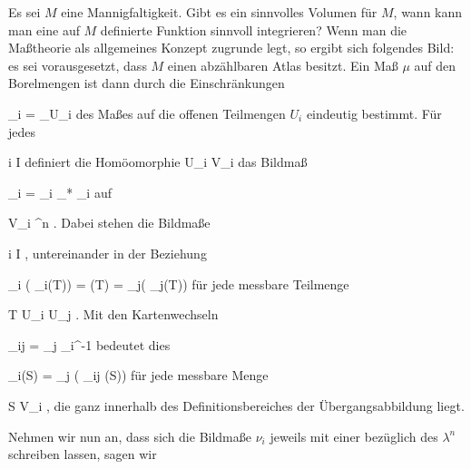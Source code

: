 
Es sei $M$ eine Mannigfaltigkeit. Gibt es ein sinnvolles Volumen für
 {} {}
$M$, wann kann man eine auf $M$ definierte Funktion sinnvoll integrieren? Wenn man die Maßtheorie als allgemeines Konzept zugrunde legt, so ergibt sich folgendes Bild: es sei vorausgesetzt, dass $M$ einen abzählbaren Atlas
 besitzt. Ein Maß $\mu$ auf den Borelmengen
 ist dann durch die Einschränkungen

\mavergleichskette
{\vergleichskette
{ \mu_i
}
{ = }{ \mu \vert_{U_i }
}
{  }{
}
{    }{
}
{   }{
}
}
{}{}{}
des Maßes auf die offenen Teilmengen $U_i$ eindeutig bestimmt. Für jedes

\mavergleichskette
{\vergleichskette
{ i
}
{ \in }{ I
}
{  }{
}
{    }{
}
{   }{
}
}
{}{}{}
definiert die Homöomorphie
 {U_i } { V_i
} {}
das Bildmaß

\mavergleichskette
{\vergleichskette
{ \nu_i
}
{ = }{ {\alpha_i }_* \mu_i
}
{  }{
}
{    }{
}
{   }{
}
}
{}{}{}
auf

\mavergleichskette
{\vergleichskette
{ V_i
}
{ \subseteq }{ \R^n
}
{  }{
}
{    }{
}
{   }{
}
}
{}{}{.}
Dabei stehen die Bildmaße

 {}
 {i \in I} {}
 {} {} {} {,}
untereinander in der Beziehung

\mavergleichskettedisp
{\vergleichskette
{\nu_i ( \alpha_i(T))
}
{ =} { \mu(T)
}
{ =} {\nu_j( \alpha_j(T))
}
{ } {
}
{ } {
}
}
{}{}{}
für jede messbare Teilmenge

\mavergleichskette
{\vergleichskette
{ T
}
{ \subseteq }{ U_i \cap U_j
}
{  }{
}
{    }{
}
{   }{
}
}
{}{}{.}
Mit den Kartenwechseln

\mavergleichskette
{\vergleichskette
{ \psi_{ij}
}
{ = }{ \alpha_j \circ \alpha_i^{-1}
}
{  }{
}
{    }{
}
{   }{
}
}
{}{}{}
bedeutet dies

\mavergleichskettedisp
{\vergleichskette
{ \nu_i(S)
}
{ =} { \nu_j ( \psi_{ij} (S))
}
{ } {
}
{ } {
}
{ } {
}
}
{}{}{}
für jede messbare Menge

\mavergleichskette
{\vergleichskette
{ S
}
{ \subseteq }{ V_i
}
{  }{
}
{    }{
}
{   }{
}
}
{}{}{,}
die ganz innerhalb des Definitionsbereiches der Übergangsabbildung liegt.

Nehmen wir nun an, dass sich die Bildmaße $\nu_i$ jeweils mit einer
bezüglich des
$\lambda^n$ schreiben lassen, sagen wir

